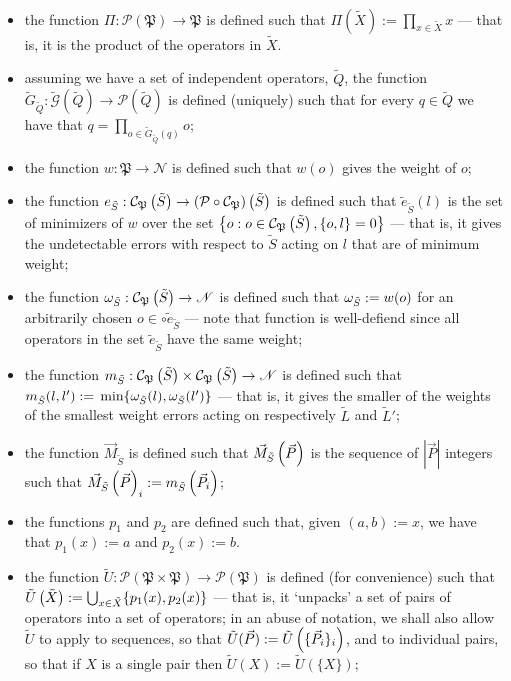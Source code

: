 \documentclass[twocolumn,showpacs,preprintnumbers,amsmath,amssymb,nofootinbib,pra,floatfix]{revtex4-1}
\newenvironment{definition}[1][Definition]{\begin{trivlist}
\item[\hskip \labelsep {\bfseries #1}]}{\end{trivlist}}
\newcommand{\lst}{\vec}
\newcommand{\set}{\tilde}
\newcommand{\genfun}{\tilde{\mathcal{G}}}
\newcommand{\pauligroup}{\mathfrak{P}}
\newcommand{\powerset}{\mathcal{P}}
\newcommand{\centralizer}{\mathcal{C}}
\begin{document}
\begin{definition}
$\quad$

\begin{itemize}
\item the function $\Pi:\powerset(\pauligroup)\to\pauligroup$ is defined such that $\Pi(\set X):=\prod_{x\in \set X} x$ --- that is, it is the product of the operators in $\set X$.
\item assuming we have a set of independent operators, $\set Q$, the function $\set G_{\set Q}:\genfun(\set Q)\to\powerset(\set Q)$ is defined (uniquely) such that for every $q\in\set Q$ we have that $q=\prod_{o\in\set G_{\set Q}(q)} o$;
\item the function $w:\pauligroup\to \mathscr{N}$ is defined such that $w(o)$ gives the weight of $o$;
\item the function $e_{\set S}:\centralizer_\pauligroup\paren{\set S}\to \paren{\powerset\circ\centralizer_\pauligroup}\paren{\set S}$ is defined such that $\set e_{\set S}(l)$ is the set of minimizers of $w$ over the set $\left\{o: o\in \centralizer_\pauligroup\paren{\set S}, \{o,l\}=0\right\}$ --- that is, it gives the undetectable errors with respect to $\set S$ acting on $l$ that are of minimum weight;
\item the function $\om_{\set S}:\centralizer_\pauligroup\paren{\set S}\to\mathscr{N}$ is defined such that $\om_{\set S}:=w(o)$ for an arbitrarily chosen $o\in\circ \set e_{\set S}$ --- note that function is well-defiend since all operators in the set $\set e_{\set S}$ have the same weight;
\item the function $m_{\set S}:\centralizer_\pauligroup\paren{\set S}\times \centralizer_\pauligroup\paren{\set S} \to \mathscr{N}$ is defined such that $m_{\set S}(l,l'):=\min \{\om_{\set S}(l),\om_{\set S}(l')\}$ --- that is, it gives the smaller of the weights of the smallest weight errors acting on respectively $\set L$ and $\set L'$;
\item the function $\lst M_{\set S}$ is defined such that $\lst M_{\set S}\paren{\lst P}$ is the sequence of $|\lst P|$ integers such that $\lst M_{\set S}\paren{\lst P}_i := m_{\set S}\paren{\lst P_i}$;
\item the functions $p_1$ and $p_2$ are defined such that, given $(a,b):=x$, we have that $p_1(x):=a$ and $p_2(x):=b$.
\item the function $\set U:\powerset(\pauligroup\times\pauligroup)\to\powerset(\pauligroup)$ is defined (for convenience) such that $\set U\paren{\set X}:=\bigcup_{x\in\set X} \{p_1(x),p_2(x)\}$ --- that is, it `unpacks' a set of pairs of operators into a set of operators;  in an abuse of notation, we shall also allow $\set U$ to apply to sequences, so that $\set U(\lst P) := \set U\paren{\{\lst P_i\}_i}$, and to individual pairs, so that if $X$ is a single pair then $\set U(X) := \set U(\{X\})$;

\end{itemize}
\end{definition}
\end{document}
